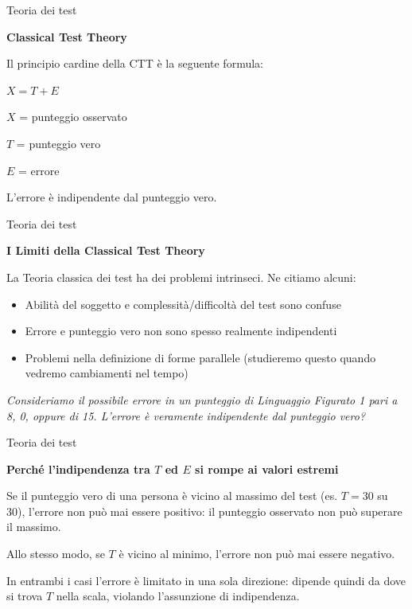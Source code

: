 \documentclass[
  ignorenonframetext,
  aspectratio=169,
]{beamer}
\begin{document}
\begin{frame}{Teoria dei test}
\label{teoria-dei-test-1}
\begin{center}
  \textbf{Classical Test Theory}
\end{center}

Il principio cardine della CTT è la seguente formula:

\begin{center}
$X = T + E$
\end{center}
\pause

\(X\) = punteggio osservato

\(T\) = punteggio vero

\(E\) = errore \pause \vspace{1.5em}

L'errore è indipendente dal punteggio vero.
\end{frame}

\begin{frame}{Teoria dei test}
\label{teoria-dei-test-2}
\begin{center}
  \textbf{I Limiti della Classical Test Theory}
\end{center}

La Teoria classica dei test ha dei problemi intrinseci. Ne citiamo
alcuni: \pause

\begin{itemize}
\item
  Abilità del soggetto e complessità/difficoltà del test sono confuse
\item
  Errore e punteggio vero non sono spesso realmente indipendenti
\item
  Problemi nella definizione di forme parallele (studieremo questo
  quando vedremo cambiamenti nel tempo)
\end{itemize}

\pause

\emph{Consideriamo il possibile errore in un punteggio di Linguaggio
Figurato 1 pari a 8, 0, oppure di 15. L'errore è veramente indipendente
dal punteggio vero?}
\end{frame}

\begin{frame}{Teoria dei test}
\label{teoria-dei-test-3}
\begin{center}
  \textbf{Perché l'indipendenza tra $T$ ed $E$ si rompe ai valori estremi}
\end{center}

Se il punteggio vero di una persona è vicino al massimo del test (es.
\(T=30\) su 30), l'errore non può mai essere positivo: il punteggio
osservato non può superare il massimo.

Allo stesso modo, se \(T\) è vicino al minimo, l'errore non può mai
essere negativo.

\pause
\vspace{1em}

In entrambi i casi l'errore è limitato in una sola direzione: dipende
quindi da dove si trova \(T\) nella scala, violando l'assunzione di
indipendenza.
\end{frame}
\end{document}

